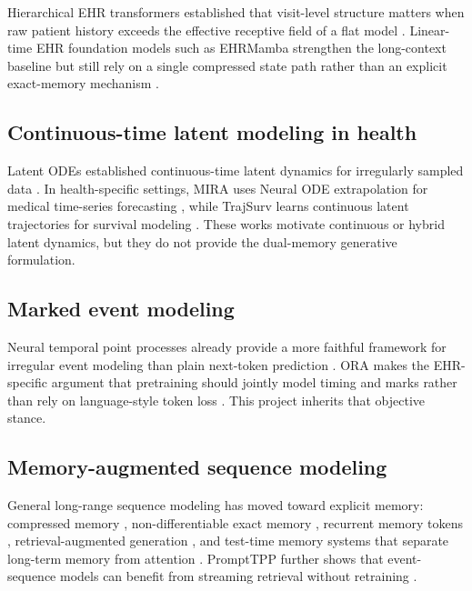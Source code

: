 \documentclass[11pt]{article}
\begin{document}
Hierarchical EHR transformers established that visit-level structure matters
when raw patient history exceeds the effective receptive field of a flat model
\cite{li2021hibehrt,odgaard2024corebehrt}. Linear-time EHR foundation models
such as EHRMamba strengthen the long-context baseline but still rely on a
single compressed state path rather than an explicit exact-memory mechanism
\cite{fallahpour2025ehrmamba}.

\subsection{Continuous-time latent modeling in health}

Latent ODEs established continuous-time latent dynamics for irregularly sampled
data \cite{rubanova2019latentode}. In health-specific settings, MIRA uses Neural
ODE extrapolation for medical time-series forecasting \cite{li2025mira}, while
TrajSurv learns continuous latent trajectories for survival modeling
\cite{zeng2025trajsurv}. These works motivate continuous or hybrid latent
dynamics, but they do not provide the dual-memory generative formulation.

\subsection{Marked event modeling}

Neural temporal point processes already provide a more faithful framework for
irregular event modeling than plain next-token prediction
\cite{enguehard2020ehrtpp,song2024dmtpp,liu2026nextpp}. ORA makes the
EHR-specific argument that pretraining should jointly model timing and marks
rather than rely on language-style token loss \cite{jing2026ora}. This project
inherits that objective stance.

\subsection{Memory-augmented sequence modeling}

General long-range sequence modeling has moved toward explicit memory:
compressed memory \cite{rae2020compressive}, non-differentiable exact memory
\cite{wu2022memorizing}, recurrent memory tokens \cite{bulatov2022rmt},
retrieval-augmented generation \cite{borgeaud2022retro}, and test-time memory
systems that separate long-term memory from attention
\cite{behrouz2025titans}. PromptTPP further shows that event-sequence models can
benefit from streaming retrieval without retraining \cite{xue2023prompttpp}.
\end{document}

